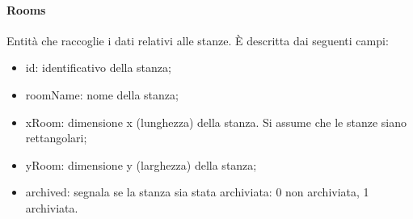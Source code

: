 \paragraph{Rooms}
Entità che raccoglie i dati relativi alle stanze. È descritta dai seguenti campi:
\begin{itemize}
	\item id: identificativo della stanza;
	\item roomName: nome della stanza;
	\item xRoom: dimensione x (lunghezza) della stanza. Si assume che le stanze siano rettangolari;
	\item yRoom: dimensione y (larghezza) della stanza;
	\item archived: segnala se la stanza sia stata archiviata: 0 non archiviata, 1 archiviata.
\end{itemize}

